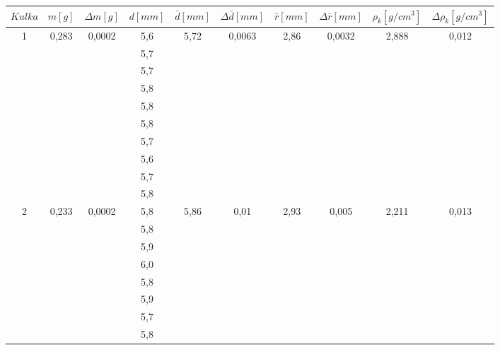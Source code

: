 \documentclass[wide,a4paper,titlepage,12pt]{mwart}
\begin{document}
    \begin{table}[hp]
      \begin{center}
        \begin{tabular}{|c|c|c|c|c|c|c|c|c|c|}
          \hline
            $Kulka$	 &
            $m[g]$	 &
            $\Delta m[g]$	 &
            $d[mm]$	 &
            $\bar{d}[mm]$	 &
            $\Delta \bar{d}[mm]$	 &
            $\bar{r}[mm]$	 &
            $\Delta \bar{r}[mm]$	 &
            $\rho_k[g/cm^3]$ &
            $\Delta \rho_k[g/cm^3]$ \\
          \hline
            \multirow{10}{*}{1} &
            \multirow{10}{*}{0,283} &
            \multirow{10}{*}{0,0002} &
            5,6 &
            \multirow{10}{*}{5,72} &
            \multirow{10}{*}{0,0063} &
            \multirow{10}{*}{2,86} &
            \multirow{10}{*}{0,0032} &
            \multirow{10}{*}{2,888} &
            \multirow{10}{*}{0,012} \\
            & & & 5,7 & & & & & &\\
            & & & 5,7 & & & & & &\\
            & & & 5,8 & & & & & &\\
            & & & 5,8 & & & & & &\\
            & & & 5,8 & & & & & &\\
            & & & 5,7 & & & & & &\\
            & & & 5,6 & & & & & &\\
            & & & 5,7 & & & & & &\\
            & & & 5,8 & & & & & &\\
          \hline
            \multirow{10}{*}{2} &
            \multirow{10}{*}{0,233} &  
            \multirow{10}{*}{0,0002} &
            5,8 &
            \multirow{10}{*}{5,86} &
            \multirow{10}{*}{0,01} &
            \multirow{10}{*}{2,93} &
            \multirow{10}{*}{0,005} &
            \multirow{10}{*}{2,211} &
            \multirow{10}{*}{0,013} \\
            & & & 5,8 & & & & & &\\
            & & & 5,9 & & & & & &\\
            & & & 6,0 & & & & & &\\
            & & & 5,8 & & & & & &\\
            & & & 5,9 & & & & & &\\
            & & & 5,7 & & & & & &\\
            & & & 5,8 & & & & & &\\

\end{tabular}
\end{center}
\end{table}
\end{document}
